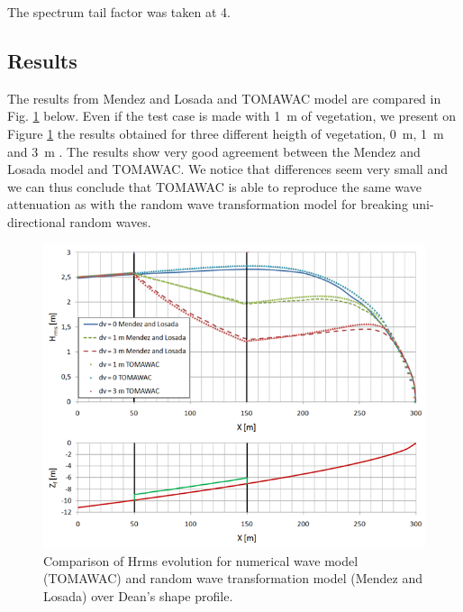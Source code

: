 The spectrum tail factor was taken at 4.

\subsection{Results}
%
 The results from Mendez and Losada and TOMAWAC model are compared in Fig. \ref{figresvito} below.
Even if the test case is made with 1~m of vegetation, we present on Figure \ref{figresvito} the results obtained for three different heigth of vegetation, 0~m, 1~m and 3~m \cite{Bacchi2014}.
The results show very good agreement between the Mendez  and Losada model \cite{Mendez2004} and TOMAWAC. We notice that differences seem very small and we can thus conclude that TOMAWAC is able to reproduce the same wave attenuation as with the random wave transformation model for breaking uni-directional random waves.
\begin{figure} [!h]
\centering
\includegraphics[scale = 0.65]{resdean.png}
 \caption{Comparison of Hrms evolution for numerical wave model (TOMAWAC) and random wave transformation model (Mendez and Losada) over Dean’s shape profile.}
\label{figresvito}
\end{figure}



